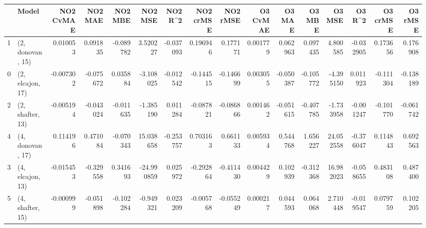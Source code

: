 \begin{tabular}{llrrrrrrrrrrrrrr}
\toprule
{} &             Model &  NO2 CvMAE &   NO2 MAE &   NO2 MBE &    NO2 MSE &   NO2 R\textasciicircum2 &  NO2 crMSE &  NO2 rMSE &  O3 CvMAE &    O3 MAE &    O3 MBE &     O3 MSE &    O3 R\textasciicircum2 &  O3 crMSE &   O3 rMSE \\
\midrule
1 &  (2, donovan, 15) &   0.010053 &  0.091835 & -0.089782 &   3.520227 & -0.037093 &   0.196946 &  0.177171 &  0.001779 &  0.062963 &  0.097435 &   4.800585 & -0.032905 &  0.173656 &  0.176908 \\
0 &  (2, elcajon, 17) &  -0.007302 & -0.075672 &  0.035884 &  -3.108025 & -0.012542 &  -0.144515 & -0.146699 &  0.003055 & -0.050387 & -0.105772 &  -4.395150 &  0.011923 & -0.111304 & -0.138189 \\
2 &  (2, shafter, 13) &  -0.005194 & -0.043024 & -0.011635 &  -1.385190 &  0.011284 &  -0.087821 & -0.086866 &  0.001462 & -0.051615 & -0.407785 &  -1.733958 & -0.001247 & -0.101770 & -0.061742 \\
4 &  (4, donovan, 17) &   0.114196 &  0.471084 & -0.070343 &  15.038658 & -0.253757 &   0.703163 &  0.661133 &  0.005934 &  0.544768 &  1.656227 &  24.052558 & -0.376047 &  0.114843 &  0.692563 \\
3 &  (4, elcajon, 13) &  -0.015453 & -0.329558 &  0.341693 & -24.990859 &  0.025972 &  -0.292864 & -0.411430 &  0.004429 &  0.102939 & -0.312368 &  16.982023 & -0.058655 &  0.483108 &  0.487400 \\
5 &  (4, shafter, 15) &  -0.000999 & -0.051898 & -0.102284 &  -0.949321 &  0.023209 &  -0.005768 & -0.055249 &  0.000217 &  0.044593 &  0.064068 &   2.710448 & -0.019547 &  0.079759 &  0.102205 \\
\bottomrule
\end{tabular}
